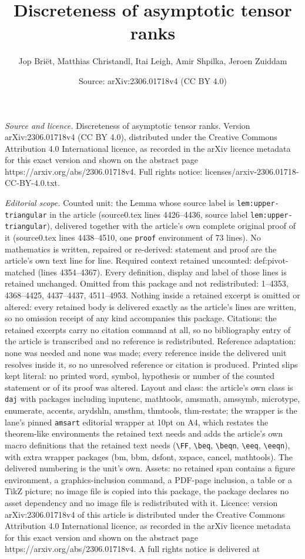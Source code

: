 \documentclass[10pt,a4paper]{amsart}
\title[Discreteness of asymptotic tensor ranks]{Discreteness of asymptotic tensor ranks}
\author{Jop Bri\"et, Matthias Christandl, Itai Leigh, Amir Shpilka, Jeroen Zuiddam}
\date{Source: arXiv:2306.01718v4 (CC BY 4.0)}
\begin{document}
\maketitle

\noindent\emph{Source and licence.} Discreteness of asymptotic tensor ranks. Version arXiv:2306.01718v4 (CC BY 4.0), distributed under the Creative Commons Attribution 4.0 International licence, as recorded in the arXiv licence metadata for this exact version and shown on the abstract page https://arxiv.org/abs/2306.01718v4. Full rights notice: licenses/arxiv-2306.01718-CC-BY-4.0.txt.\par\smallskip

\noindent\textit{Editorial scope.} Counted unit: the Lemma whose source label is \texttt{lem:upper-triangular} in the article (source0.tex lines 4426--4436, source label \texttt{lem:upper-triangular}), delivered together with the article's own complete original proof of it (source0.tex lines 4438--4510, one \texttt{proof} environment of 73 lines). No mathematics is written, repaired or re-derived: statement and proof are the article's own text line for line. Required context retained uncounted: def:pivot-matched (lines 4354--4367). Every definition, display and label of those lines is retained unchanged. Omitted from this package and not redistributed: 1--4353, 4368--4425, 4437--4437, 4511--4953. Nothing inside a retained excerpt is omitted or altered: every retained body is delivered exactly as the article's lines are written, so no omission receipt of any kind accompanies this package. Citations: the retained excerpts carry no citation command at all, so no bibliography entry of the article is transcribed and no reference is redistributed. Reference adaptation: none was needed and none was made; every reference inside the delivered unit resolves inside it, so no unresolved reference or citation is produced. Printed slips kept literal: no printed word, symbol, hypothesis or number of the counted statement or of its proof was altered. Layout and class: the article's own class is \texttt{daj} with packages including inputenc, mathtools, amsmath, amssymb, microtype, enumerate, accents, arydshln, amsthm, thmtools, thm-restate; the wrapper is the lane's pinned \texttt{amsart} editorial wrapper at 10pt on A4, which restates the theorem-like environments the retained text needs and adds the article's own macro definitions that the retained text needs (\texttt{\textbackslash FF}, \texttt{\textbackslash beq}, \texttt{\textbackslash beqn}, \texttt{\textbackslash eeq}, \texttt{\textbackslash eeqn}), with extra wrapper packages (bm, bbm, dsfont, xspace, cancel, mathtools). The delivered numbering is the unit's own. Assets: no retained span contains a figure environment, a graphics-inclusion command, a PDF-page inclusion, a table or a TikZ picture; no image file is copied into this package, the package declares no asset dependency and no image file is redistributed with it. Licence: version arXiv:2306.01718v4 of this article is distributed under the Creative Commons Attribution 4.0 International licence, as recorded in the arXiv licence metadata for this exact version and shown on the abstract page https://arxiv.org/abs/2306.01718v4. A full rights notice is delivered at 
\end{document}
